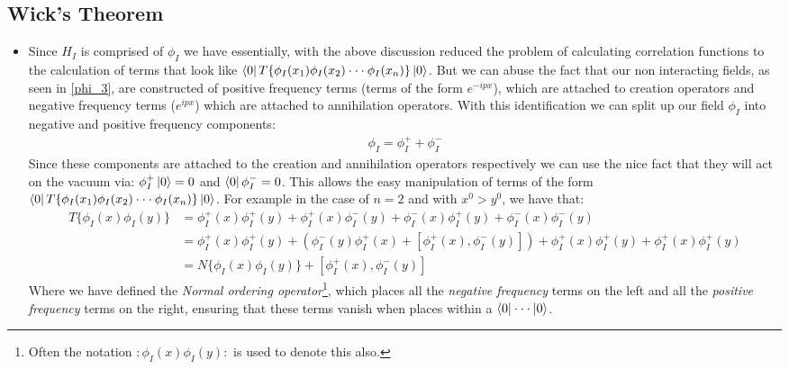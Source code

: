 \documentclass[11pt]{article}
\numberwithin{equation}{section}
\begin{document}

\subsection{Wick's Theorem} %
\label{sub:wick_s_theorem}
\begin{itemize}
  \item Since $H_I$ is comprised of $\phi_I$ we have essentially, with the above discussion reduced the problem of calculating correlation functions to the calculation of terms that look like $ \bra{0}T\{\phi_I(x_1)\phi_I(x_2)\cdot\cdot\cdot\phi_I(x_n)\}\ket{0}$. But we can abuse the fact that our non interacting fields, as seen in \ref{phi_3}, are constructed of positive frequency terms (terms of the form $e^{-ipx}$), which are attached to creation operators and negative frequency terms ($e^{ipx}$) which are attached to annihilation operators. With this identification we can split up our field $\phi_I$ into negative and positive frequency components: 
  \begin{align*}
    \phi_I = \phi_I^++\phi_I^-
  \end{align*}
  Since these components are attached to the creation and annihilation operators respectively we can use the nice fact that they will act on the vacuum via: $\phi_I^+\ket{0} =0$ and $\bra{0}\phi_I^-= 0$. This allows the easy manipulation of terms of the form $ \bra{0}T\{\phi_I(x_1)\phi_I(x_2)\cdot\cdot\cdot\phi_I(x_n)\}\ket{0}$. For example in the case of $n=2$ and with $x^0>y^0$, we have that:
  \begin{align*}
     T\{\phi_I(x)\phi_I(y)\} & =  \phi_I^+(x)\phi_I^+(y)+\phi_I^+(x)\phi_I^-(y)+\phi_I^-(x)\phi_I^+(y)+\phi_I^-(x)\phi_I^-(y) \\
     & = \phi_I^+(x)\phi_I^+(y)+\left(\phi_I^-(y)\phi_I^+(x)+\left[\phi_I^+(x),\phi_I^-(y)\right]\right) +\phi_I^+(x)\phi_I^+(y)+\phi_I^+(x)\phi_I^+(y) \\
     & = N\{\phi_I(x)\phi_I(y)\}+\left[\phi_I^+(x),\phi_I^-(y)\right]
   \end{align*} 
   Where we have defined the \emph{Normal ordering operator}\footnote{Often the notation $:\phi_I(x)\phi_I(y):$ is used to denote this also.}, which places all the \emph{negative frequency} terms on the left and all the \emph{positive frequency} terms on the right, ensuring that these terms vanish when places within a $\bra{0} \cdot \cdot \cdot \ket{0}$. 


\end{itemize}
\end{document}
